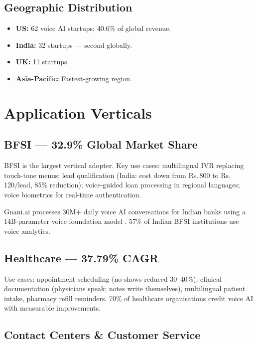 \documentclass[12pt,a4paper]{article}
\begin{document}
\subsection{Geographic Distribution}
\begin{itemize}[noitemsep]
  \item \textbf{US:} 62 voice AI startups; 40.6\% of global revenue.
  \item \textbf{India:} 32 startups --- second globally.
  \item \textbf{UK:} 11 startups.
  \item \textbf{Asia-Pacific:} Fastest-growing region.
\end{itemize}

\section{Application Verticals}
\label{sec:applications}

\subsection{BFSI --- 32.9\% Global Market Share}

BFSI is the largest vertical adopter.  Key use cases: multilingual IVR
replacing touch-tone menus; lead qualification (India: cost down from
Rs.\,800 to Rs.\,120/lead, 85\% reduction); voice-guided loan processing in
regional languages; voice biometrics for real-time authentication.

Gnani.ai processes 30M+ daily voice AI conversations for Indian banks using
a 14B-parameter voice foundation model \cite{callerdigital-guide}.  57\%
of Indian BFSI institutions use voice analytics.

\subsection{Healthcare --- 37.79\% CAGR}

Use cases: appointment scheduling (no-shows reduced 30--40\%), clinical
documentation (physicians speak; notes write themselves), multilingual
patient intake, pharmacy refill reminders.  70\% of healthcare organisations
credit voice AI with measurable improvements.

\subsection{Contact Centers \& Customer Service}
\end{document}
